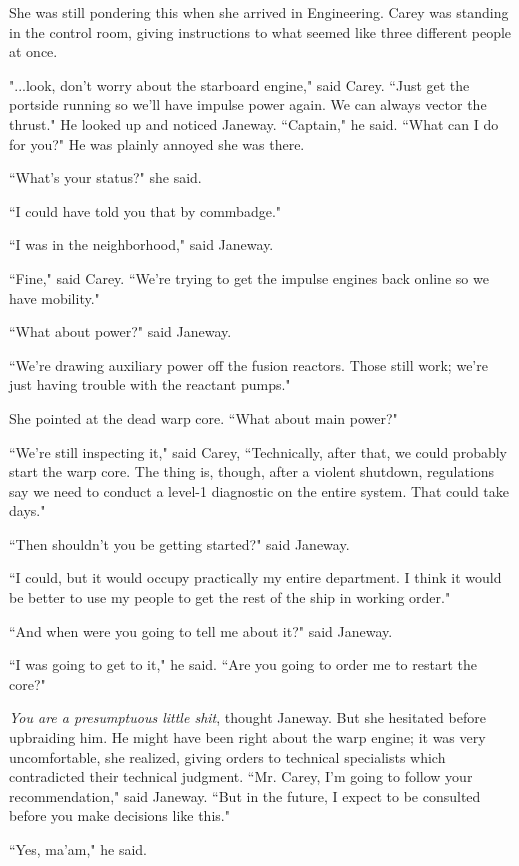\documentclass[twoside,letterpaper,12pt]{memoir}
\begin{document}
She was still pondering this when she arrived in Engineering. Carey was standing in the control room, giving instructions to what seemed like three different people at once.

"...look, don't worry about the starboard engine," said Carey. ``Just get the portside running so we'll have impulse power again. We can always vector the thrust." He looked up and noticed Janeway. ``Captain," he said. ``What can I do for you?" He was plainly annoyed she was there.

``What's your status?" she said.

``I could have told you that by commbadge."

``I was in the neighborhood," said Janeway.

``Fine," said Carey. ``We're trying to get the impulse engines back online so we have mobility."

``What about power?" said Janeway.

``We're drawing auxiliary power off the fusion reactors. Those still work; we're just having trouble with the reactant pumps."

She pointed at the dead warp core. ``What about main power?"

``We're still inspecting it," said Carey, ``Technically, after that, we could probably start the warp core. The thing is, though, after a violent shutdown, regulations say we need to conduct a level-1 diagnostic on the entire system. That could take days."

``Then shouldn't you be getting started?" said Janeway.

``I could, but it would occupy practically my entire department. I think it would be better to use my people to get the rest of the ship in working order."

``And when were you going to tell me about it?" said Janeway.

``I was going to get to it," he said. ``Are you going to order me to restart the core?"

\textit{You are a presumptuous little shit}, thought Janeway. But she hesitated before upbraiding him. He might have been right about the warp engine; it was very uncomfortable, she realized, giving orders to technical specialists which contradicted their technical judgment. ``Mr. Carey, I'm going to follow your recommendation," said Janeway. ``But in the future, I expect to be consulted before you make decisions like this."

``Yes, ma'am," he said.
\end{document}
